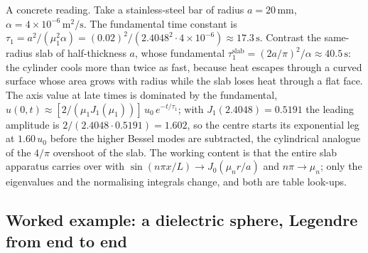 A concrete reading. Take a stainless-steel bar of radius $a =
20\,\si{\milli\meter}$, $\alpha = 4\times 10^{-6}\,\si{\meter
\squared\per\second}$. The fundamental time constant is
$\tau_{1} = a^{2}/(\mu_{1}^{2}\alpha) = (0.02)^{2}/(2.4048^{2}
\cdot 4\times 10^{-6}) \approx 17.3\,\si{\second}$. Contrast the
same-radius slab of half-thickness $a$, whose fundamental
$\tau_{1}^{\text{slab}} = (2a/\pi)^{2}/\alpha \approx 40.5\,\si{
\second}$: the cylinder cools more than twice as fast, because heat
escapes through a curved surface whose area grows with radius while
the slab loses heat through a flat face. The axis value at late
times is dominated by the fundamental, $u(0, t) \approx
[2/(\mu_{1}J_{1}(\mu_{1}))]\, u_{0}\, e^{-t/\tau_{1}}$; with
$J_{1}(2.4048) = 0.5191$ the leading amplitude is $2/(2.4048
\cdot 0.5191) = 1.602$, so the centre starts its exponential leg
at $1.60\,u_{0}$ before the higher Bessel modes are subtracted,
the cylindrical analogue of the $4/\pi$ overshoot of the slab. The
working content is that the entire slab apparatus carries over with
$\sin(n\pi x/L) \to J_{0}(\mu_{n}r/a)$ and $n\pi \to \mu_{n}$; only
the eigenvalues and the normalising integrals change, and both are
table look-ups.

\subsection{Worked example: a dielectric sphere, Legendre from end to end}

